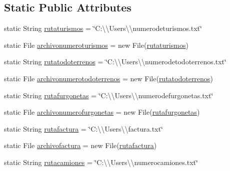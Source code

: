 \subsection*{Static Public Attributes}
\begin{DoxyCompactItemize}
\item 
static String \mbox{\hyperlink{classejercicio2_1_1_interfaz_aedf7c4fdca449dda8705501967cd8b9f}{rutaturismos}} = \char`\"{}C\+:\textbackslash{}\textbackslash{}\+Users\textbackslash{}\textbackslash{}numerodeturismos.\+txt\char`\"{}
\item 
static File \mbox{\hyperlink{classejercicio2_1_1_interfaz_a73ca9de41f5c1cd4e8b00d15cfe9442a}{archivonumeroturismos}} = new File(\mbox{\hyperlink{classejercicio2_1_1_interfaz_aedf7c4fdca449dda8705501967cd8b9f}{rutaturismos}})
\item 
static String \mbox{\hyperlink{classejercicio2_1_1_interfaz_a66ed3ce11762e65ad1ab32420ba0678b}{rutatodoterrenos}} = \char`\"{}C\+:\textbackslash{}\textbackslash{}\+Users\textbackslash{}\textbackslash{}numerodetodoterrenos.\+txt\char`\"{}
\item 
static File \mbox{\hyperlink{classejercicio2_1_1_interfaz_a813c04b93858e3af6c3b855ef5ae1964}{archivonumerotodoterrenos}} = new File(\mbox{\hyperlink{classejercicio2_1_1_interfaz_a66ed3ce11762e65ad1ab32420ba0678b}{rutatodoterrenos}})
\item 
static String \mbox{\hyperlink{classejercicio2_1_1_interfaz_ad1224c474c5fd40a26df18653bca8034}{rutafurgonetas}} = \char`\"{}C\+:\textbackslash{}\textbackslash{}\+Users\textbackslash{}\textbackslash{}numerodefurgonetas.\+txt\char`\"{}
\item 
static File \mbox{\hyperlink{classejercicio2_1_1_interfaz_ad97381e5c7d82bbdbf606390522f2181}{archivonumerofurgonetas}} = new File(\mbox{\hyperlink{classejercicio2_1_1_interfaz_ad1224c474c5fd40a26df18653bca8034}{rutafurgonetas}})
\item 
static String \mbox{\hyperlink{classejercicio2_1_1_interfaz_ac6c007f1bd1ece3fb4e95ba1969daf82}{rutafactura}} = \char`\"{}C\+:\textbackslash{}\textbackslash{}\+Users\textbackslash{}\textbackslash{}factura.\+txt\char`\"{}
\item 
static File \mbox{\hyperlink{classejercicio2_1_1_interfaz_a897fa4f18ca280fa92941fdf25e8a1f1}{archivofactura}} = new File(\mbox{\hyperlink{classejercicio2_1_1_interfaz_ac6c007f1bd1ece3fb4e95ba1969daf82}{rutafactura}})
\item 
static String \mbox{\hyperlink{classejercicio2_1_1_interfaz_a78395e467465db3af1017176104a3285}{rutacamiones}} = \char`\"{}C\+:\textbackslash{}\textbackslash{}\+Users\textbackslash{}\textbackslash{}numerocamiones.\+txt\char`\"{}

\end{DoxyCompactItemize}
